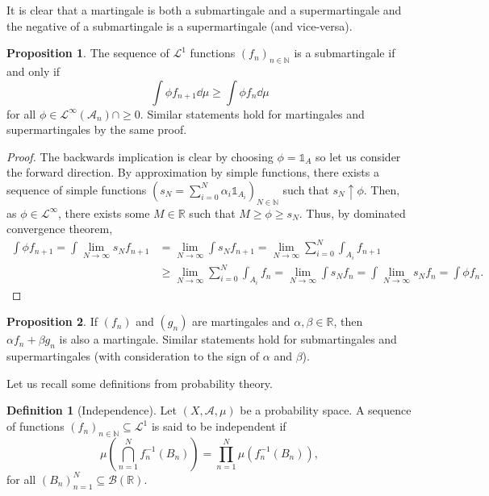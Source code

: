 \documentclass[]{article}
\theoremstyle{definition}
\theoremstyle{definition}
\newtheorem{definition}{Definition}[section]
\newtheorem{proposition}{Proposition}[section]
\begin{document}
It is clear that a martingale is both a submartingale and a supermartingale and 
the negative of a submartingale is a supermartingale (and vice-versa).

\begin{proposition}
  The sequence of \(\mathcal{L}^1\) functions \((f_n)_{n \in \mathbb{N}}\) is a 
  submartingale if and only if 
  \[\int \phi f_{n + 1} \dd \mu \ge \int \phi f_n \dd \mu\]
  for all \(\phi \in \mathcal{L}^\infty(\mathcal{A}_n) \cap \ge 0\). 
  Similar statements hold for martingales and supermartingales by the same proof.
\end{proposition}
\begin{proof}
  The backwards implication is clear by choosing \(\phi = \mathbb{1}_A\) so 
  let us consider the forward direction. By approximation by simple functions, 
  there exists a sequence of simple functions 
  \(\left(s_N = \sum_{i = 0}^N \alpha_i \mathbb{1}_{A_i}\right)_{N \in \mathbb{N}}\) 
  such that \(s_N \uparrow \phi\). Then, as \(\phi \in \mathcal{L}^\infty\), 
  there exists some \(M \in \mathbb{R}\) such that \(M \ge \phi \ge s_N\). 
  Thus, by dominated convergence theorem, 
  \[\begin{split}
    \int \phi f_{n + 1} = \int \lim_{N \to \infty} s_N f_{n + 1} 
    & = \lim_{N \to \infty} \int s_N f_{n + 1} 
      = \lim_{N \to \infty} \sum_{i = 0}^N \int_{A_i} f_{n + 1}\\
    & \ge \lim_{N \to \infty} \sum_{i = 0}^N \int_{A_i} f_n 
      = \lim_{N \to \infty} \int s_N f_n = \int \lim_{N \to \infty} s_N f_n 
      = \int \phi f_n.
    \end{split}\] 
\end{proof}

\begin{proposition}
  If \((f_n)\) and \((g_n)\) are martingales and \(\alpha, \beta \in \mathbb{R}\),
  then \(\alpha f_n + \beta g_n\) is also a martingale. Similar statements 
  hold for submartingales and supermartingales (with consideration to the  
  sign of \(\alpha\) and \(\beta\)).
\end{proposition}

Let us recall some definitions from probability theory.

\begin{definition}[Independence]
  Let \((X, \mathcal{A}, \mu)\) be a probability space. A sequence of 
  functions \((f_n)_{n \in \mathbb{N}} \subseteq \mathcal{L}^1\) is said to be 
  independent if 
  \[\mu\left(\bigcap_{n = 1}^N f_n^{-1}(B_n)\right) = 
    \prod_{n = 1}^N\mu(f_n^{-1}(B_n)),\]
  for all \((B_n)_{n = 1}^N \subseteq \mathcal{B}(\mathbb{R})\).
\end{definition}
\end{document}
